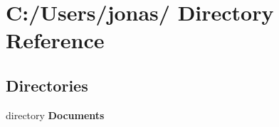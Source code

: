 \section{C:/Users/jonas/ Directory Reference}
\label{dir_C_3A_2FUsers_2Fjonas_2F}


\subsection*{Directories}
\begin{CompactItemize}
\item 
directory {\bf Documents}
\end{CompactItemize}
